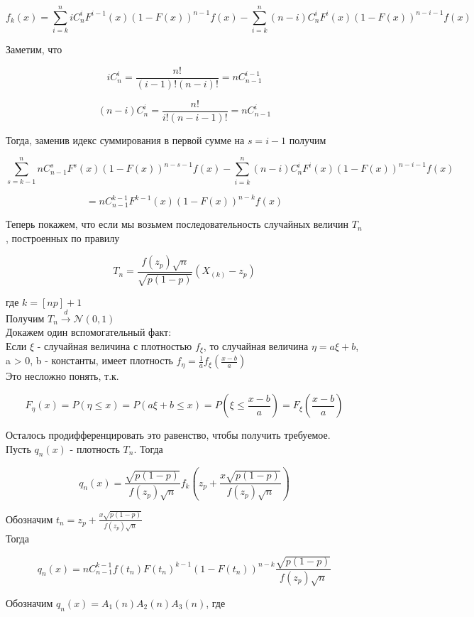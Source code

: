 \documentclass{article}
\begin{document}
$$ f_k(x) = \sum_{i=k}^n{iC_n^iF^{i-1}(x)(1 - F(x))^{n - 1}f(x)} - \sum_{i=k}^n{(n - i)C_n^iF^i(x)(1 - F(x))^{n - i - 1}f(x)}$$

Заметим, что

$$ iC_n^i = \frac{n!}{(i-1)!(n-i)!} = nC_{n-1}^{i-1} $$

$$ (n-i)C_n^i = \frac{n!}{i!(n - i - 1)!} = nC_{n-1}^i$$

Тогда, заменив идекс суммирования в первой сумме на $s = i - 1$ получим

$$ \sum_{s = k - 1}^n{nC_{n-1}^sF^s(x)(1 - F(x))^{n - s - 1}f(x)} - \sum_{i=k}^n{(n - i)C_n^iF^i(x)(1 - F(x))^{n - i - 1}f(x)}$$

$$ = nC_{n-1}^{k-1}F^{k-1}(x)(1 - F(x))^{n - k}f(x)$$

Теперь покажем, что если мы возьмем последовательность случайных величин $T_n$, построенных по правилу

$$ T_n = \frac{f(z_p)\sqrt{n}}{\sqrt{p(1-p)}}(X_{(k)} - z_p)$$

где $k = [np] + 1$\\

Получим $T_n \xrightarrow{d} \mathcal{N}(0,1)$\\

Докажем один вспомогательный факт:\\

Если $\xi$ - случайная величина с плотностью $f_\xi$, то случайная величина $\eta = a\xi + b$, a > 0, b - константы, имеет плотность $f_\eta = \frac{1}{a}f_\xi(\frac{x - b}{a})$\\

Это несложно понять, т.к.

$$ F_\eta(x) = P(\eta\leq x) = P(a\xi + b\leq x) = P(\xi\leq \frac{x-b}{a}) = F_\xi(\frac{x-b}{a})$$

Осталось продифференцировать это равенство, чтобы получить требуемое.\\

Пусть $q_n(x)$ - плотность $T_n$. Тогда

$$q_n(x) = \frac{\sqrt{p(1-p)}}{f(z_p)\sqrt{n}}f_k(z_p + \frac{x\sqrt{p(1-p)}}{f(z_p)\sqrt{n}})$$

Обозначим $t_n = z_p + \frac{x\sqrt{p(1-p)}}{f(z_p)\sqrt{n}}$\\

Тогда 

$$ q_n(x) = nC_{n-1}^{k-1}f(t_n)F(t_n)^{k-1}(1-F(t_n))^{n-k}\frac{\sqrt{p(1-p)}}{f(z_p)\sqrt{n}} $$

Обозначим $q_n(x) = A_1(n)A_2(n)A_3(n)$, где\\
\end{document}
